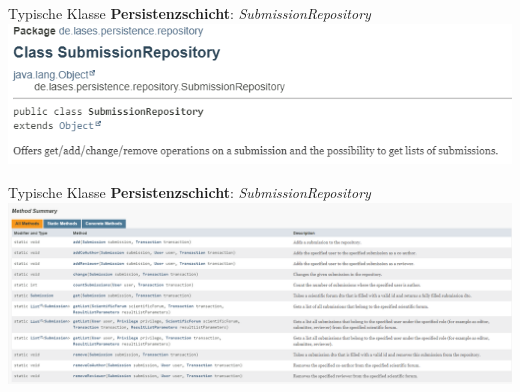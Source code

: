 \documentclass{beamer}
\begin{document}
    \begin{frame}{Typische Klasse \textbf{Persistenzschicht}: \emph{SubmissionRepository}}
        \centering
        \includegraphics[height=0.4\textheight]{graphics/repo/doc_repo}
    \end{frame}
    \begin{frame}{Typische Klasse \textbf{Persistenzschicht}: \emph{SubmissionRepository}}
        \centering
        \includegraphics[height=0.5\textheight]{graphics/repo/doc_static}
    \end{frame}
\end{document}

